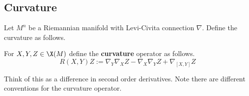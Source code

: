 

\subsection{Curvature}
Let $M^n$ be a Riemannian manifold with Levi-Civita connection $\nabla$. Define the curvature as follows.
\begin{df}
For $X,Y,Z\in \X(M)$ define the \textbf{curvature} operator as follows.
\[
R(X,Y)Z:=\nabla_Y\nabla_X Z-\nabla_X\nabla_Y Z+\nabla_{[X,Y]}Z
\]
\end{df}
Think of this as a difference in second order derivatives. Note there are different conventions for the curvature operator. 

